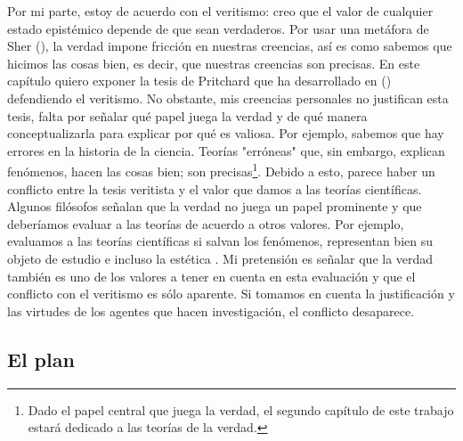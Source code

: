 Por mi parte, estoy de acuerdo con el veritismo: creo que el valor de cualquier estado epistémico depende de que sean verdaderos.
Por usar una metáfora de Sher (\citeyear{sher2016}), la verdad impone fricción en nuestras creencias, así es como sabemos que hicimos las cosas bien, es decir, que nuestras creencias son precisas.
En este capítulo quiero exponer la tesis de Pritchard que ha desarrollado en (\citeyear{pritchard2021, pritchard2021a}) defendiendo el veritismo.
No obstante, mis creencias personales no justifican esta tesis, falta por señalar qué papel juega la verdad y de qué manera conceptualizarla para explicar por qué es valiosa.
Por ejemplo, sabemos que hay errores en la historia de la ciencia.
Teorías "erróneas" que, sin embargo, explican fenómenos, hacen las cosas bien; son precisas\footnote{Dado el papel central que juega la verdad, el segundo capítulo de este trabajo estará dedicado a las teorías de la verdad.}.
Debido a esto, parece haber un conflicto entre la tesis veritista y el valor que damos a las teorías científicas.
Algunos filósofos señalan que la verdad no juega un papel prominente y que deberíamos evaluar a las teorías de acuerdo a otros valores.
Por ejemplo, evaluamos a las teorías científicas si salvan los fenómenos, representan bien su objeto de estudio e incluso la estética \parencite{ivanova2020}.
Mi pretensión es señalar que la verdad también es uno de los valores a tener en cuenta en esta evaluación y que el conflicto con el veritismo es sólo aparente.
Si tomamos en cuenta la justificación y las virtudes de los agentes que hacen investigación, el conflicto desaparece.

\subsection{El plan}


